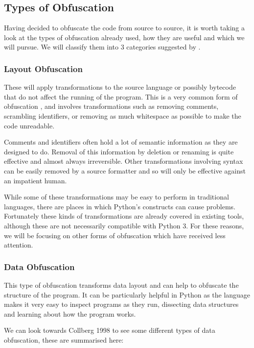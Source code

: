 \documentclass{report}
\begin{document}
\subsection{Types of Obfuscation}

Having decided to obfuscate the code from source to source, it is worth taking a look at the types of
obfuscation already used, how they are useful and which we will pursue. We will classify them into 3 categories
suggested by \cite[p10]{desevobf}.

\subsubsection{Layout Obfuscation}

These will apply transformations to the source language or possibly bytecode that do not affect the running of the
program. This is a very common form of obfuscation \cite[p10]{desevobf}, and involves transformations such as removing comments,
scrambling identifiers, or removing as much whitespace as possible to make the code unreadable.

Comments and identifiers often hold a lot of semantic information as they are designed to do.
Removal of this information by deletion or renaming is quite effective and almost always irreversible. Other transformations involving syntax
can be easily removed by a source formatter and so will only be effective against an impatient human.

While some of these transformations may be easy to perform in traditional languages, there are places in which
Python's constructs can cause problems. Fortunately these kinds of transformations are already covered in existing
tools, although these are not necessarily compatible with Python 3. For these reasons, we will be focusing on other forms of
obfuscation which have received less attention.

\subsubsection{Data Obfuscation}

This type of obfuscation transforms data layout and can help to obfuscate the structure of the program. It can be
particularly helpful in Python as the language makes it very easy to inspect programs as they run, dissecting data
structures and learning about how the program works.

We can look towards Collberg 1998 \cite{dataobf} to see some different types of data obfuscation, these are summarised here:
\end{document}
